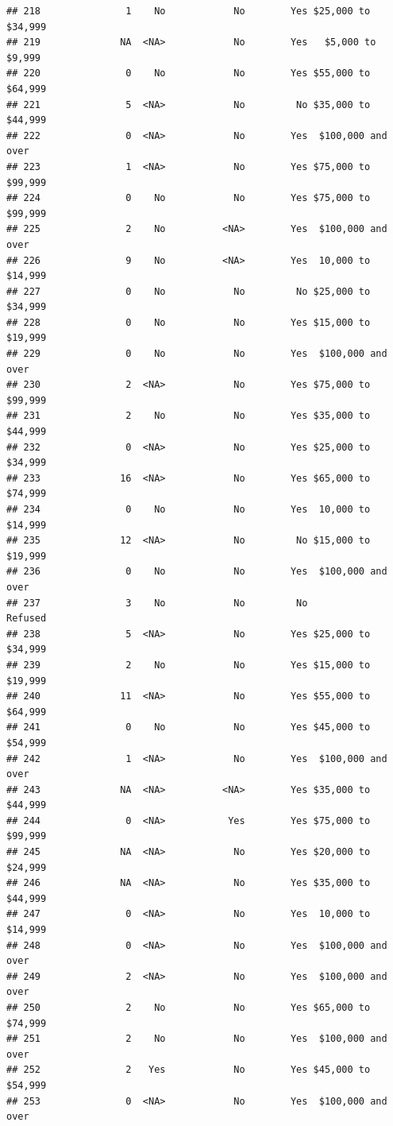 \documentclass[man]{apa6}
\begin{document}
\begin{verbatim}
## 218               1    No            No        Yes $25,000 to $34,999
## 219              NA  <NA>            No        Yes   $5,000 to $9,999
## 220               0    No            No        Yes $55,000 to $64,999
## 221               5  <NA>            No         No $35,000 to $44,999
## 222               0  <NA>            No        Yes  $100,000 and over
## 223               1  <NA>            No        Yes $75,000 to $99,999
## 224               0    No            No        Yes $75,000 to $99,999
## 225               2    No          <NA>        Yes  $100,000 and over
## 226               9    No          <NA>        Yes  10,000 to $14,999
## 227               0    No            No         No $25,000 to $34,999
## 228               0    No            No        Yes $15,000 to $19,999
## 229               0    No            No        Yes  $100,000 and over
## 230               2  <NA>            No        Yes $75,000 to $99,999
## 231               2    No            No        Yes $35,000 to $44,999
## 232               0  <NA>            No        Yes $25,000 to $34,999
## 233              16  <NA>            No        Yes $65,000 to $74,999
## 234               0    No            No        Yes  10,000 to $14,999
## 235              12  <NA>            No         No $15,000 to $19,999
## 236               0    No            No        Yes  $100,000 and over
## 237               3    No            No         No            Refused
## 238               5  <NA>            No        Yes $25,000 to $34,999
## 239               2    No            No        Yes $15,000 to $19,999
## 240              11  <NA>            No        Yes $55,000 to $64,999
## 241               0    No            No        Yes $45,000 to $54,999
## 242               1  <NA>            No        Yes  $100,000 and over
## 243              NA  <NA>          <NA>        Yes $35,000 to $44,999
## 244               0  <NA>           Yes        Yes $75,000 to $99,999
## 245              NA  <NA>            No        Yes $20,000 to $24,999
## 246              NA  <NA>            No        Yes $35,000 to $44,999
## 247               0  <NA>            No        Yes  10,000 to $14,999
## 248               0  <NA>            No        Yes  $100,000 and over
## 249               2  <NA>            No        Yes  $100,000 and over
## 250               2    No            No        Yes $65,000 to $74,999
## 251               2    No            No        Yes  $100,000 and over
## 252               2   Yes            No        Yes $45,000 to $54,999
## 253               0  <NA>            No        Yes  $100,000 and over

\end{verbatim}
\end{document}
